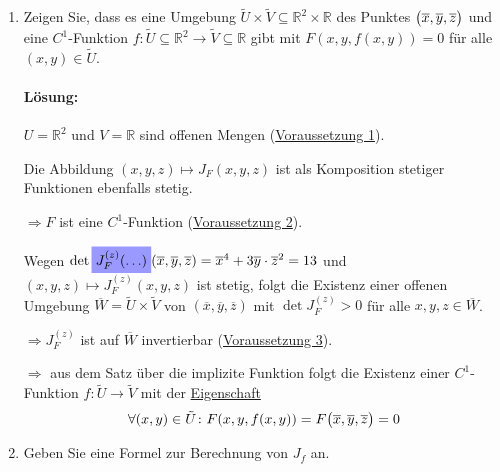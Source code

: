 \documentclass{scrreprt}
\begin{document}
\begin{enumerate}[1)]
\item Zeigen Sie, dass es eine Umgebung
  $\tilde{U} \times \tilde{V} \subseteq \mathbb{R}^2 \times \mathbb{R}$
  des Punktes $\qty\big(\overline{x}, \overline{y}, \overline{z})$
  und eine $C^1$-Funktion
  $f \colon \tilde{U} \subseteq \mathbb{R}^2 \to \tilde{V} \subseteq \mathbb{R}$
  gibt mit $F(x, y, f(x, y)) = 0$ für alle $(x, y) \in \tilde{U}$.

  \paragraph{Lösung:} $U = \mathbb{R}^2$ und $V = \mathbb{R}$ sind offenen
  Mengen (\hyperref[vor:1]{Voraussetzung 1}).

  Die Abbildung $(x, y, z) \mapsto J_F(x, y, z)$ ist als Komposition stetiger
  Funktionen ebenfalls stetig.

  $\Rightarrow F$ ist eine $C^1$-Funktion (\hyperref[vor:2]{Voraussetzung 2}).

  Wegen
  $\det \colorbox{blue!40}{$J_F^{(z)} (\ldots)$}(\overline{x}, \overline{y}, \overline{z}) =
  \overline{x}^4 + 3\overline{y} \cdot \overline{z}^2 = 13$ und
  $(x, y, z) \mapsto J_F^{(z)}(x, y, z)$ ist stetig, folgt die
  Existenz einer offenen Umgebung
  $\overline{W} = \tilde{U} \times \tilde{V}$ von
  $(\overline{x}, \overline{y}, \overline{z})$ mit
  $\det J_F^{(z)} > 0$ für alle $x, y, z \in \overline{W}$.

  $\Rightarrow J_F^{(z)}$ ist auf $\overline{W}$ invertierbar
  (\hyperref[vor:3]{Voraussetzung 3}).

  $\Rightarrow$ aus dem Satz über die implizite Funktion folgt
  die Existenz einer $C^1$-Funktion $f \colon \tilde{U} \to \tilde{V}$
  mit der \hyperref[folg:1]{Eigenschaft}
  \[
    \forall (x, y) \in \tilde{U} \colon F(x, y, f(x, y)) =
    F\qty\big(\overline{x}, \overline{y}, \overline{z})
    = 0
  \]
\newpage
\item Geben Sie eine Formel zur Berechnung von $J_f$ an.

\end{enumerate}
\end{document}
